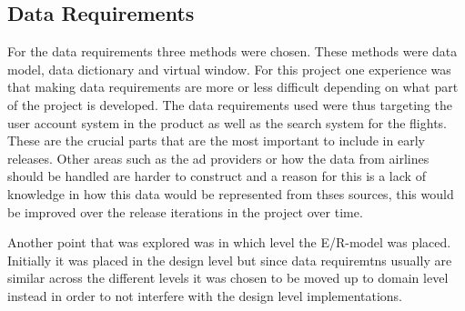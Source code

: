\subsection{Data Requirements}

For the data requirements three methods were chosen. These methods were data model, data dictionary and virtual window. For this project one experience was that
making data requirements are more or less difficult depending on what part of the project is developed. The data requirements used were thus targeting the user
account system in the product as well as the search system for the flights. These are the crucial parts that are the most important to include in early releases.
Other areas such as the ad providers or how the data from airlines should be handled are harder to construct and a reason for this is a lack of knowledge in
how this data would be represented from thses sources, this would be improved over the release iterations in the project over time.

Another point that was explored was in which level the E/R-model was placed. Initially it was placed in the design level but since data requiremtns usually are similar
across the different levels it was chosen to be moved up to domain level instead in order to not interfere with the design level implementations.